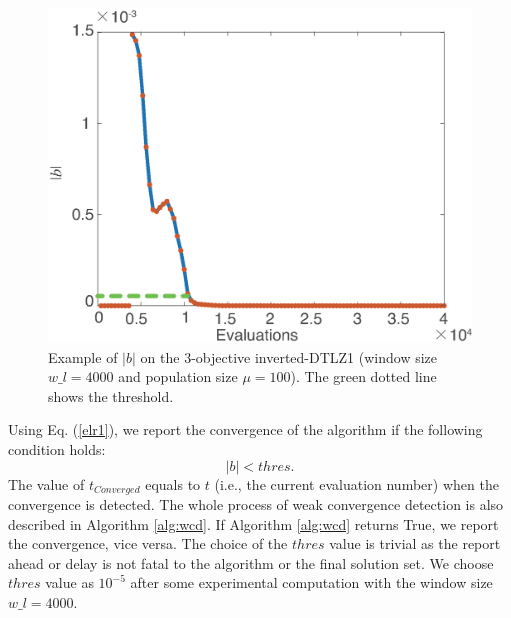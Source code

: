 \documentclass[conference]{IEEEtran}
\begin{document}
\begin{figure}[!t]
  \centering
    \includegraphics[width=\columnwidth]{FVEMOA_IDTLZ1_M3_nadir_2}
  \caption{Example of $\lvert b\rvert$ on the 3-objective inverted-DTLZ1
  (window size $w\_l = 4000$ and population size $\mu = 100$).
  The green dotted line shows the threshold.
  }
  \label{wcd2}
\end{figure}

Using Eq. (\ref{elr1}), we report the convergence of the algorithm if the following
condition holds:
\begin{equation}\label{elr2}
  \lvert b \rvert < thres. 
\end{equation}
The value of $t_{Converged}$ equals to $t$ (i.e., the current evaluation number) 
when the convergence is detected. 
The whole process of weak convergence detection is also described in Algorithm \ref{alg:wcd}. 
If Algorithm \ref{alg:wcd} returns True, we report the convergence, vice versa. 
The choice of the $thres$ value is trivial 
as the report ahead or delay is not fatal to the algorithm or the final solution set.
We choose $thres$ value as $10^{-5}$ after some experimental computation with 
the window size $w\_ l = 4000$. 
\end{document}
